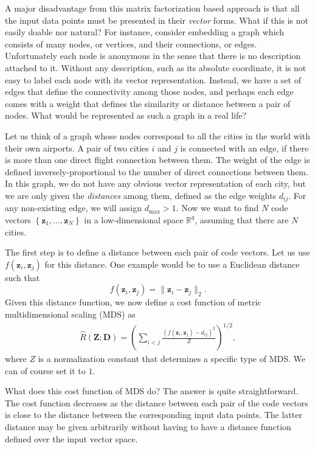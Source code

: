 \documentclass{report}
\newcommand{\vect}[1]{\mathbf{#1}}
\newcommand{\matr}[1]{\mathbf{#1}}
\newcommand{\vz}[0]{\vect{z}}
\newcommand{\mZ}[0]{\matr{Z}}
\newcommand{\mD}{\matr{D}}
\newcommand{\RR}[0]{\mathbb{R}}
\begin{document}
A major disadvantage from this matrix factorization based approach is that all
the input data points must be presented in their {\it vector} forms. What if
this is not easily doable nor natural? For instance, consider embedding a graph
which consists of many nodes, or vertices, and their connections, or edges.
Unfortunately each node is anonymous in the sense that there is no description
attached to it. Without any description, such as its absolute coordinate, it is
not easy to label each node with its vector representation. Instead, we have a
set of edges that define the connectivity among those nodes, and perhaps each
edge comes with a weight that defines the similarity or distance between a pair
of nodes. What would be represented as such a graph in a real life? 

Let us think of a graph whose nodes correspond to all the cities in the world
with their own airports. A pair of two cities $i$ and $j$ is connected with an
edge, if there is more than one direct flight connection between them. The
weight of the edge is defined inversely-proportional to the number of direct
connections between them. In this graph, we do not have any obvious vector
representation of each city, but we are only given the {\it distances} among
them, defined as the edge weights $d_{ij}$. For any non-existing edge, we will
assign $d_{\max} > 1$.  Now we want to find $N$ code vectors $\left\{ \vz_1,
\ldots, \vz_N \right\}$ in a low-dimensional space $\RR^q$, assuming that there
are $N$ cities. 

The first step is to define a distance between each pair of code vectors. Let us
use $f(\vz_i, \vz_j)$ for this distance. One example would be to use a Euclidean
distance such that
\[
    f(\vz_i, \vz_j) = \| \vz_i - \vz_j \|_2.
\]
Given this distance function, we now define a cost function of metric
multidimensional scaling (MDS) as
\begin{align}
    \label{eq:mds}
    \hat{R}(\mZ; \mD) = \left(
        \sum_{i < j} \frac{
            (f(\vz_i, \vz_j) - d_{ij})^2
        }{Z}
    \right)^{1/2},
\end{align}
where $Z$ is a normalization constant that determines a specific type of MDS. We
can of course set it to $1$.

What does this cost function of MDS do? The answer is quite straightforward. The
cost function decreases as the distance between each pair of the code vectors is
close to the distance between the corresponding input data points. The latter
distance may be given arbitrarily without having to have a distance function
defined over the input vector space. 
\end{document}
